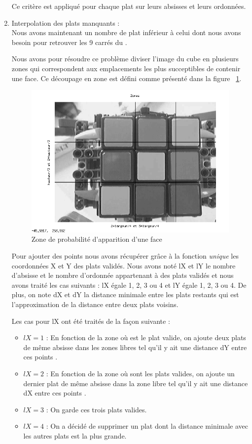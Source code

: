 \begin{enumerate}
  Ce critère est appliqué pour chaque plat sur leurs absisses et leurs ordonnées. 

  \item Interpolation des plats manquants : \\

  Nous avons maintenant un nombre de plat inférieur à celui dont nous avons besoin pour retrouver les 9 carrés du \rubic{}. 

  Nous avons pour résoudre ce problème diviser l'image du cube en plusieurs zones qui correspondent aux emplacements les plus succeptibles de contenir une face. 
  Ce découpage en zone est défini comme présenté dans la figure ~\ref{variance2D_zone}. 

\begin{figure}[!ht]
\centering
\includegraphics[width=\linewidth]{Images/Variance2D_zone.png} 
\caption{Zone de probabilité d'apparition d'une face} 
\label{variance2D_zone}
\end{figure}

  Pour ajouter des points nous avons récupérer grâce à la fonction \textit{unique} les coordonnées X et Y des plats validés. 
Nous avons noté lX et lY le nombre d'absisse et le nombre d'ordonnée appartenant à des plats validés et nous avons traité les cas suivants : lX égale 1, 2, 3 ou 4 et lY égale 1, 2, 3 ou 4. 
De plus, on note dX et dY la distance minimale entre les plats restants qui est l'approximation de la distance entre deux plats voisins. 

Les cas pour lX ont été traités de la façon suivante : 
  \begin{itemize}
    \item $lX=1$ : En fonction de la zone où est le plat valide, on ajoute deux plats de même absisse dans les zones libres tel qu'il y ait une distance dY entre ces points . 
    \item $lX=2$ : En fonction de la zone où sont les plats valides, on ajoute un dernier plat de même absisse dans la zone libre tel qu'il y ait une distance dX entre ces points . 
    \item $lX=3$ : On garde ces trois plats valides. 
    \item $lX=4$ : On a décidé de supprimer un plat dont la distance minimale avec les autres plats est la plus grande. 
  \end{itemize}


\end{enumerate}
